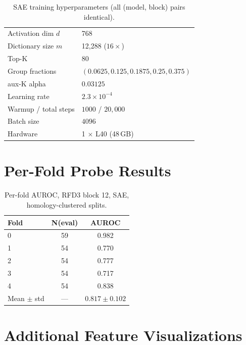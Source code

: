 \documentclass{article}
\begin{document}
\begin{table}[h]
\centering
\begin{tabular}{ll}
\toprule
Activation dim $d$ & 768 \\
Dictionary size $m$ & 12{,}288 ($16\times$) \\
Top-K & 80 \\
Group fractions & $(0.0625, 0.125, 0.1875, 0.25, 0.375)$ \\
aux-K alpha & $0.03125$ \\
Learning rate & $2.3 \times 10^{-4}$ \\
Warmup / total steps & $1000$ / $20{,}000$ \\
Batch size & $4096$ \\
Hardware & 1 $\times$ L40 (48\,GB) \\
\bottomrule
\end{tabular}
\caption{SAE training hyperparameters (all (model, block) pairs identical).}
\end{table}

\section{Per-Fold Probe Results}
\label{app:perfold}

\begin{table}[h]
\centering
\begin{tabular}{lcc}
\toprule
Fold & N(eval) & AUROC \\
\midrule
0 & 59 & 0.982 \\
1 & 54 & 0.770 \\
2 & 54 & 0.777 \\
3 & 54 & 0.717 \\
4 & 54 & 0.838 \\
\midrule
Mean $\pm$ std & --- & $0.817 \pm 0.102$ \\
\bottomrule
\end{tabular}
\caption{Per-fold AUROC, RFD3 block 12, SAE, homology-clustered splits.}
\label{tab:perfold_block12}
\end{table}

\section{Additional Feature Visualizations}
\label{app:moreviz}
\end{document}
